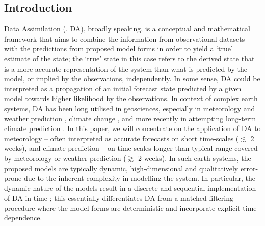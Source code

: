 \documentclass[a4paper,10pt]{article}
\begin{document}
\begin{multicols}{2}
\section{Introduction}
\label{sec:intro}
Data Assimilation (. DA), broadly speaking, is a conceptual and mathematical framework that aims to combine the information from observational datasets with the predictions from proposed model forms in order to yield a `true' estimate of the state; the `true' state in this case refers to the derived state that is a more accurate representation of the system than what is predicted by the model, or implied by the observations, independently. In some sense, DA could be interpreted as a propagation of an initial forecast state predicted by a given model towards higher likelihood by  the observations. In context of complex earth systems, DA has been long utilised in geosciences, especially in meteorology and weather prediction \citep{carrassi2018}, climate change \citep{hannart2016}, and more recently in attempting long-term climate prediction \citep{penny2019}.  In this paper, we will concentrate on the application of DA to meteorology -- often interpreted as accurate forecasts on short time-scales ($\lesssim$ 2 weeks), and climate prediction -- on time-scales longer than typical range covered by meteorology or weather prediction ($\gtrsim$ 2 weeks). In such earth systems, the proposed models are typically dynamic, high-dimensional and qualitatively error-prone due to the inherent complexity in modelling the system. In particular, the dynamic nature of the models result in a discrete and sequential implementation of DA in time \citep{carrassi2018}; this essentially differentiates DA from a matched-filtering procedure where the model forms are deterministic and incorporate explicit time-dependence. 


\end{multicols}
\end{document}
